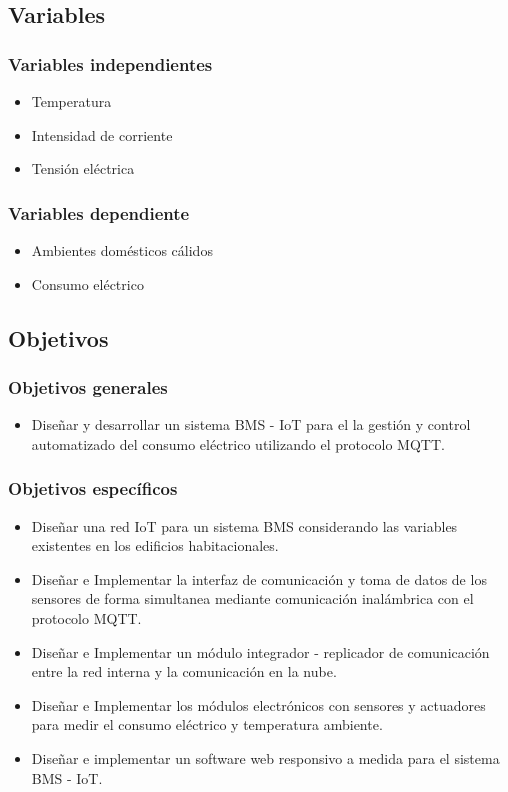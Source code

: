 \documentclass[a4paper, 12pt]{article}
\begin{document}
\subsection{Variables}

\vskip 0.2cm  
\subsubsection{Variables independientes}

\begin{itemize}
\item Temperatura
\item Intensidad de corriente
\item Tensión eléctrica
\end{itemize}

\subsubsection{Variables dependiente}
\begin{itemize}
\item Ambientes domésticos cálidos
\item Consumo eléctrico
\end{itemize}

\subsection{Objetivos}

\vskip 0.2cm 
\subsubsection{Objetivos generales}
\begin{itemize}
\item Diseñar y desarrollar un sistema BMS - IoT para el la gestión y control 
automatizado del consumo eléctrico utilizando el protocolo MQTT.
\end{itemize}

\subsubsection{Objetivos específicos}
\begin{itemize}
\item Diseñar una red IoT para un sistema BMS considerando las variables existentes en los edificios habitacionales.
\item Diseñar e Implementar la interfaz de comunicación y toma de datos de los sensores de forma simultanea mediante comunicación inalámbrica con el protocolo MQTT.
\item Diseñar e Implementar un módulo integrador - replicador de comunicación entre la red interna y la comunicación en la nube.
\item Diseñar e Implementar los módulos electrónicos con sensores y actuadores para medir el consumo eléctrico y temperatura ambiente.
\item Diseñar e implementar un software web responsivo a medida para el sistema BMS - IoT.
\end{itemize}
\end{document}
